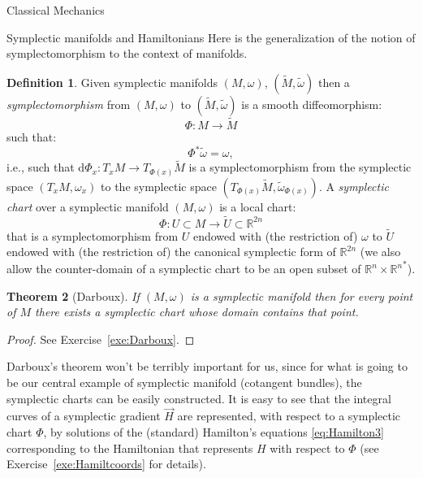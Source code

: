 \documentclass[oneside,a4paper,11pt]{amsbook}
\newcommand{\R}{\mathds R}
\newcommand{\dd}{\mathrm d}
\theoremstyle{remark}\newtheorem{exercise}{Exercise}[chapter]
\theoremstyle{plain}\newtheorem{teo}{Theorem}[section]
\theoremstyle{plain}\newtheorem{lem}[teo]{Lemma}
\theoremstyle{plain}\newtheorem{prop}[teo]{Proposition}
\theoremstyle{plain}\newtheorem{cor}[teo]{Corollary}
\theoremstyle{definition}\newtheorem{defin}[teo]{Definition}
\theoremstyle{remark}\newtheorem{rem}[teo]{Remark}
\theoremstyle{definition}\newtheorem{notation}[teo]{Notation}
\theoremstyle{definition}\newtheorem{convention}[teo]{Convention}
\theoremstyle{definition}\newtheorem{example}[teo]{Example}
\numberwithin{section}{chapter}
\numberwithin{equation}{section}
\begin{document}
\begin{chapter}{Classical Mechanics}
\begin{section}{Symplectic manifolds and Hamiltonians}
Here is the generalization of the notion of symplectomorphism to the context of manifolds.
\begin{defin}
Given symplectic manifolds $(M,\omega)$, $(\widetilde M,\tilde\omega)$ then a {\em symplectomorphism\/} from $(M,\omega)$
to $(\widetilde M,\tilde\omega)$ is a smooth diffeomorphism:
\[\Phi:M\longrightarrow\widetilde M\]
such that:
\[\Phi^*\tilde\omega=\omega,\]
i.e., such that $\dd\Phi_x:T_xM\to T_{\Phi(x)}\widetilde M$ is a symplectomorphism from the symplectic space $(T_xM,\omega_x)$
to the symplectic space $(T_{\Phi(x)}\widetilde M,\tilde\omega_{\Phi(x)})$. A {\em symplectic chart\/} over a symplectic manifold
$(M,\omega)$ is a local chart:
\[\Phi:U\subset M\longrightarrow\widetilde U\subset\R^{2n}\]
that is a symplectomorphism from $U$ endowed with (the restriction of) $\omega$ to $\widetilde U$ endowed with (the restriction of) the canonical
symplectic form of $\R^{2n}$ (we also allow the counter-domain of a symplectic chart to be an open subset of
$\R^n\times{\R^n}^*$).
\end{defin}

\begin{teo}[Darboux]\label{thm:Darboux}
If $(M,\omega)$ is a symplectic manifold then for every point of $M$ there exists a symplectic chart whose domain
contains that point.
\end{teo}
\begin{proof}
See Exercise~\ref{exe:Darboux}.
\end{proof}
Darboux's theorem won't be terribly important for us, since for what is going to be our central example of symplectic manifold (cotangent bundles), the symplectic charts can
be easily constructed. It is easy to see that the integral curves of a symplectic gradient $\vec H$ are represented, with respect to a symplectic chart $\Phi$,
by solutions of the (standard) Hamilton's equations
\eqref{eq:Hamilton3} corresponding to the Hamiltonian that represents $H$ with respect to $\Phi$ (see Exercise~\ref{exe:Hamiltcoords} for details).

\medskip


\end{section}
\end{chapter}
\end{document}
